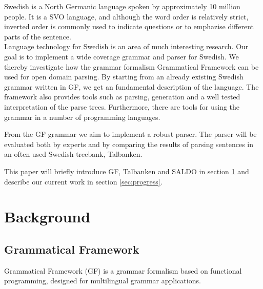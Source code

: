 \documentclass[submission]{eptcs} %
\begin{document}
Swedish is a North Germanic language spoken by approximately 10 million people.
It is a SVO language, and although the word order is relatively strict,
inverted order is commonly used
to indicate questions or to emphazise different parts of the sentence. \\
Language technology for Swedish is an area of much interesting research.
Our goal is to implement a wide coverage grammar and parser for Swedish.
We thereby investigate how the grammar formalism Grammatical Framework
can be used for open domain parsing.
By starting from an already existing Swedish grammar written in GF, we get 
an fundamental description of the language. The framework also provides
tools such as parsing, generation and
a well tested interpretation of the parse trees. Furthermore, there are tools
for using the grammar in a number of programming languages. 

From the GF grammar we aim to implement a robust parser. 
The parser will be evaluated both by experts and by comparing the results of
parsing sentences in an often used Swedish treebank, Talbanken.

This paper will briefly introduce GF, Talbanken and SALDO in section \ref{sec:background}
and describe our current work in section \ref{sec:progress}.

\section{Background}
\label{sec:background}
\subsection{Grammatical Framework}
\label{sec:gf}



Grammatical Framework\cite{ranta-2011} (GF) is a grammar formalism based on functional
programming, designed for multilingual grammar applications.
\end{document}

